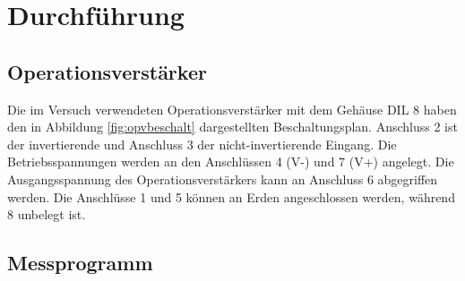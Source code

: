  \section{Durchführung}
\label{sec:Durchführung}

\subsection{Operationsverstärker}

Die im Versuch verwendeten Operationsverstärker mit dem Gehäuse DIL 8 haben den in Abbildung \ref{fig:opvbeschalt}
dargestellten Beschaltungsplan. Anschluss 2 ist der invertierende und
Anschluss 3 der nicht-invertierende Eingang. Die Betriebsspannungen werden an den Anschlüssen 4 (V-) und 7 (V+)
angelegt. Die Ausgangsspannung des Operationsverstärkers kann an Anschluss 6 abgegriffen werden. Die Anschlüsse
1 und 5 können an Erden angeschlossen werden, während 8 unbelegt ist.


\subsection{Messprogramm}

